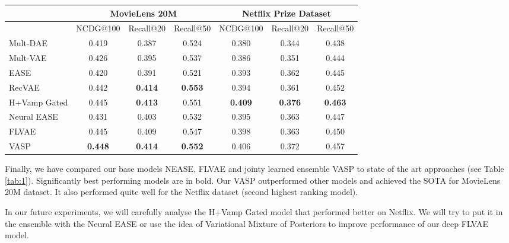 \documentclass[conference]{IEEEtran}
\begin{document}
\begin{table*}\label{tab:1}\caption{Results}
        \centering
        \begin{tabular}{@{}lcccccc@{}}
            \toprule
                            & \multicolumn{3}{c}{MovieLens 20M}& \multicolumn{3}{c}{Netflix Prize Dataset} \\ 
            \midrule
                    \multicolumn{1}{l}{} & NCDG@100 &Recall@20 & Recall@50 & NCDG@100 & Recall@20 & Recall@50 \\ 
            \midrule \multicolumn{1}{l}{Mult-DAE}     & 0.419 & 0.387 & 0.524 & 0.380 & 0.344 & 0.438 \\
                \multicolumn{1}{l}{Mult-VAE}     & 0.426 & 0.395 & 0.537 & 0.386 & 0.351 & 0.444 \\
                \multicolumn{1}{l}{EASE}         & 0.420 & 0.391 & 0.521 & 0.393 & 0.362 & 0.445 \\
                \multicolumn{1}{l}{RecVAE}       & 0.442 & {\bf 0.414} & {\bf 0.553} & 0.394 & 0.361 & 0.452 \\
                    \multicolumn{1}{l}{H+Vamp Gated} & 0.445 & {\bf 0.413} & 0.551 & {\bf 0.409} & {\bf 0.376} & {\bf 0.463} \\ 
            \midrule \multicolumn{1}{l}{Neural EASE}        & 0.431 & 0.403 & 0.532 & 0.395 & 0.363 & 0.447 \\
                \multicolumn{1}{l}{FLVAE}        & 0.445 & 0.409 & 0.547 & 0.398 & 0.363 & 0.450 \\
                \multicolumn{1}{l}{VASP}         & {\bf 0.448} & {\bf 0.414} & {\bf 0.552} & 0.406 & 0.372 & 0.457 \\ 
            \bottomrule
        \end{tabular}
        
        
    \end{table*}
  
  Finally, we have compared our base models NEASE, FLVAE and jointy learned ensemble VASP to state of the art approaches (see Table \ref{tab:1}). Significantly best performing models are in bold. Our VASP outperformed other models and achieved the SOTA for MovieLens 20M dataset. It also performed quite well for the Netflix dataset (second highest ranking model). 
  
  In our future experiments, we will carefully analyse the H+Vamp Gated model that performed better on Netflix. We will try to put it in the ensemble with the Neural EASE or use the idea of Variational Mixture of
Posteriors to improve performance of our deep FLVAE model.
    
\end{document}
